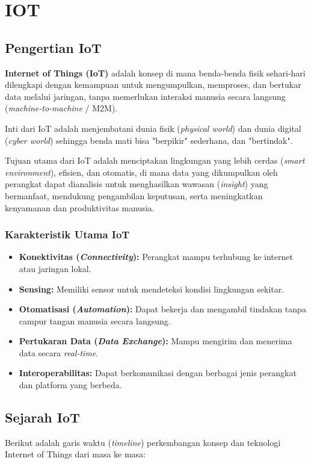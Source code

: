 \section{IOT}
\subsection{Pengertian IoT}
\textbf{Internet of Things (IoT)} adalah konsep di mana benda-benda fisik sehari-hari dilengkapi dengan kemampuan untuk mengumpulkan, memproses, dan bertukar data melalui jaringan, tanpa memerlukan interaksi manusia secara langsung (\textit{machine-to-machine} / M2M). 

Inti dari IoT adalah menjembatani dunia fisik (\textit{physical world}) dan dunia digital (\textit{cyber world}) sehingga benda mati bisa "berpikir" sederhana, dan "bertindak".

Tujuan utama dari IoT adalah menciptakan lingkungan yang lebih cerdas (\textit{smart environment}), efisien, dan otomatis, di mana data yang dikumpulkan oleh perangkat dapat dianalisis untuk menghasilkan wawasan (\textit{insight}) yang bermanfaat, mendukung pengambilan keputusan, serta meningkatkan kenyamanan dan produktivitas manusia.

\subsubsection{Karakteristik Utama IoT}
\begin{itemize}
    \item \textbf{Konektivitas (\textit{Connectivity}):} Perangkat mampu terhubung ke internet atau jaringan lokal.
    \item \textbf{Sensing:} Memiliki sensor untuk mendeteksi kondisi lingkungan sekitar.
    \item \textbf{Otomatisasi (\textit{Automation}):} Dapat bekerja dan mengambil tindakan tanpa campur tangan manusia secara langsung.
    \item \textbf{Pertukaran Data (\textit{Data Exchange}):} Mampu mengirim dan menerima data secara \textit{real-time}.
    \item \textbf{Interoperabilitas:} Dapat berkomunikasi dengan berbagai jenis perangkat dan platform yang berbeda.
\end{itemize}

\subsection{Sejarah IoT}
Berikut adalah garis waktu (\textit{timeline}) perkembangan konsep dan teknologi Internet of Things dari masa ke masa:

